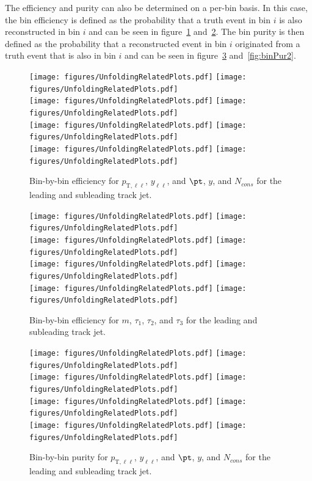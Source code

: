 The efficiency and purity can also be determined on a per-bin basis. In this case, the bin efficiency is defined as the probability that a truth event in bin $i$ is also reconstructed in bin $i$ and can be seen in figure~\ref{fig:binEff1} and~\ref{fig:binEff2}. The bin purity is then defined as the probability that a reconstructed event in bin $i$ originated from a truth event that is also in bin $i$ and can be seen in figure~\ref{fig:binPur1} and~\ref{fig:binPur2}.

\begin{figure}[h!]
  \centering
  \texttt{[image: figures/UnfoldingRelatedPlots.pdf]}
  \texttt{[image: figures/UnfoldingRelatedPlots.pdf]} \\
  \texttt{[image: figures/UnfoldingRelatedPlots.pdf]}
  \texttt{[image: figures/UnfoldingRelatedPlots.pdf]} \\
  \texttt{[image: figures/UnfoldingRelatedPlots.pdf]}
  \texttt{[image: figures/UnfoldingRelatedPlots.pdf]} \\
  \texttt{[image: figures/UnfoldingRelatedPlots.pdf]}
  \texttt{[image: figures/UnfoldingRelatedPlots.pdf]}
  \caption{Bin-by-bin efficiency for $p_{\text{T},\ell\ell}$, $y_{\ell\ell}$, and $\pt$, $y$, and $N_{cons}$ for the leading and subleading track jet.}
  \label{fig:binEff1}
\end{figure}

\begin{figure}[h!]
  \centering
  \texttt{[image: figures/UnfoldingRelatedPlots.pdf]}
  \texttt{[image: figures/UnfoldingRelatedPlots.pdf]} \\
  \texttt{[image: figures/UnfoldingRelatedPlots.pdf]}
  \texttt{[image: figures/UnfoldingRelatedPlots.pdf]} \\
  \texttt{[image: figures/UnfoldingRelatedPlots.pdf]}
  \texttt{[image: figures/UnfoldingRelatedPlots.pdf]} \\
  \texttt{[image: figures/UnfoldingRelatedPlots.pdf]}
  \texttt{[image: figures/UnfoldingRelatedPlots.pdf]}
  \caption{Bin-by-bin efficiency for $m$, $\tau_1$, $\tau_2$, and $\tau_3$ for the leading and subleading track jet.}
  \label{fig:binEff2}
\end{figure}

\begin{figure}[h!]
  \centering
  \texttt{[image: figures/UnfoldingRelatedPlots.pdf]}
  \texttt{[image: figures/UnfoldingRelatedPlots.pdf]} \\
  \texttt{[image: figures/UnfoldingRelatedPlots.pdf]}
  \texttt{[image: figures/UnfoldingRelatedPlots.pdf]} \\
  \texttt{[image: figures/UnfoldingRelatedPlots.pdf]}
  \texttt{[image: figures/UnfoldingRelatedPlots.pdf]} \\
  \texttt{[image: figures/UnfoldingRelatedPlots.pdf]}
  \texttt{[image: figures/UnfoldingRelatedPlots.pdf]}
  \caption{Bin-by-bin purity for $p_{\text{T},\ell\ell}$, $y_{\ell\ell}$, and $\pt$, $y$, and $N_{cons}$ for the leading and subleading track jet.}
  \label{fig:binPur1}
\end{figure}

